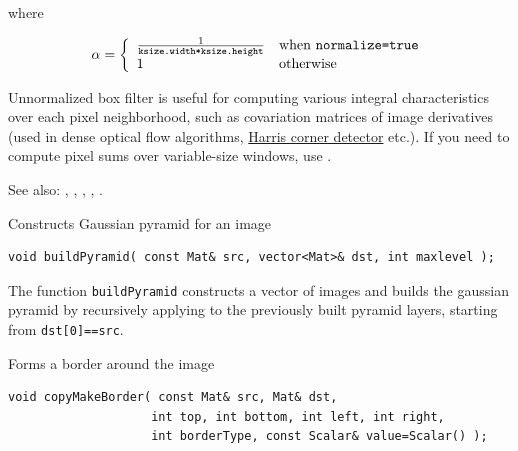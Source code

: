 where

\[\alpha=\left\{ \begin{array}{l l} \frac{1}{\texttt{ksize.width*ksize.height}} & \mbox{when \texttt{normalize=true}}\\ 1 & \mbox{otherwise}\\ \end{array} \right. \]

Unnormalized box filter is useful for computing various integral characteristics over each pixel neighborhood, such as covariation matrices of image derivatives (used in dense optical flow algorithms, \href{conerHarris}{Harris corner detector} etc.). If you need to compute pixel sums over variable-size windows, use .

See also: , , , , .

\label{buildPyramid}
Constructs Gaussian pyramid for an image

\begin{lstlisting}
void buildPyramid( const Mat& src, vector<Mat>& dst, int maxlevel );
\end{lstlisting}
\begin{description}
\end{description}

The function \texttt{buildPyramid} constructs a vector of images and builds the gaussian pyramid by recursively applying  to the previously built pyramid layers, starting from \texttt{dst[0]==src}.

\label{copyMakeBorder}
Forms a border around the image

\begin{lstlisting}
void copyMakeBorder( const Mat& src, Mat& dst,
                    int top, int bottom, int left, int right,
                    int borderType, const Scalar& value=Scalar() );
\end{lstlisting}
\begin{description}
\end{description}

